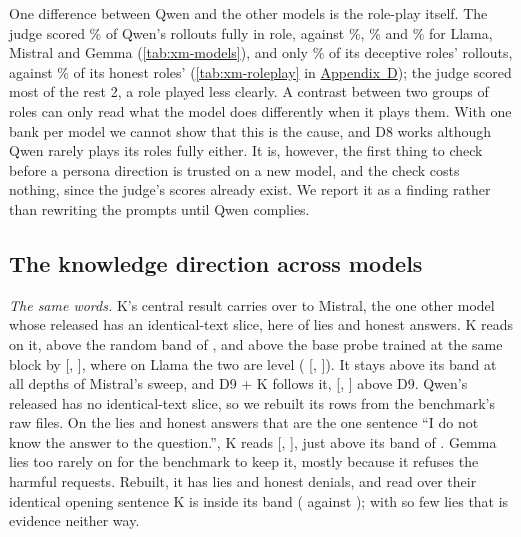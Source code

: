 One difference between Qwen and the other models is the role-play itself. The judge scored
\% of Qwen's rollouts fully in role, against \%,
\% and \% for Llama, Mistral and Gemma
(\cref{tab:xm-models}), and only \% of its deceptive roles' rollouts, against
\% of its honest roles' (\cref{tab:xm-roleplay} in
\hyperref[app:xmodel]{Appendix~D}); the judge scored most of the rest 2, a role played less clearly. A
contrast between two groups of roles can only read what the model does differently when it plays them. With one bank per model
we cannot show that this is the cause, and D8 works although Qwen rarely plays its roles fully either. It
is, however, the first thing to check before a persona direction is trusted on a new model, and the check
costs nothing, since the judge's scores already exist. We report it as a finding rather than rewriting the
prompts until Qwen complies.

\subsection{The knowledge direction across models}
\label{sec:xm-k}

\emph{The same words.} K's central result carries over to Mistral, the one other model whose released
\hpkr{} has an identical-text slice, here of  lies and
 honest answers. K reads  on it, above the random band of
, and above the base probe trained at the same block by
 [, ],
where on Llama the two are level ( [,
]). It stays above its band at all  depths
of Mistral's sweep, and D9 + K follows it, 
[, ] above D9. Qwen's released
\hpkr{} has no identical-text slice, so we rebuilt its rows from the benchmark's raw files. On the
 lies and  honest answers that are the one sentence
``I do not know the answer to the question.'', K reads  [,
], just above its band of . Gemma lies too rarely on
\hpkr{} for the benchmark to keep it, mostly because it refuses the harmful requests. Rebuilt, it has
 lies and  honest denials, and read over their identical
opening sentence K is inside its band ( against ); with so
few lies that is evidence neither way.

